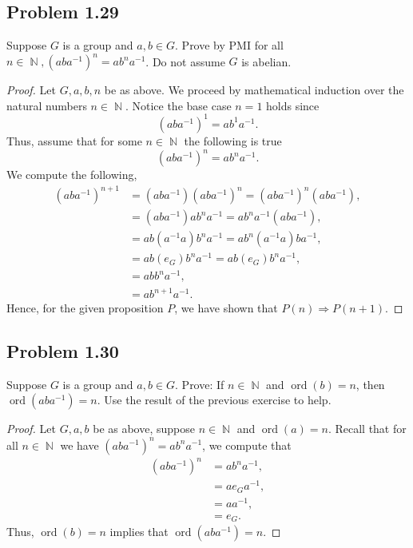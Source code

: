 \documentclass{amsbook}
\DeclareMathOperator{\ord}{\text{ord}}
\DeclareMathOperator{\N}{\mathbb{N}}
\begin{document}
			\subsection*{Problem 1.29}
			\label{sub:problem_1_29}
			Suppose $G$ is a group and $a, b \in G$. 
			Prove by PMI for all $n \in \N, (aba^{-1})^{n} = ab^{n}a^{-1}$.
			Do not assume $G$ is abelian.
			\begin{proof} Let $G,a,b,n$ be as above.
			We proceed by mathematical induction over the natural numbers $n \in \N$.
			Notice the base case $n = 1$ holds since $$\left(aba^{-1}\right)^{1} = ab^{1}a^{-1}.$$
			Thus, assume that for some $n \in \N$ the following is true $$(aba^{-1})^{n} = ab^{n}a^{-1}.$$
			We compute the following,
				\begin{align*}
					\left(aba^{-1}\right)^{n+1} &= \left(aba^{-1}\right)\left(aba^{-1}\right)^{n} = \left(aba^{-1}\right)^{n}\left(aba^{-1}\right),\\
					&= \left(aba^{-1}\right) ab^{n}a^{-1} = ab^{n}a^{-1}\left(aba^{-1}\right), \\
					&= ab\left(a^{-1}a\right)b^{n}a^{-1} = ab^{n}\left(a^{-1}a\right)ba^{-1}, \\
					&= ab(e_{G})b^{n}a^{-1} = ab(e_{G})b^{n}a^{-1}, \\
					&= abb^{n}a^{-1}, \\
					&= ab^{n+1}a^{-1}.
				\end{align*}
			Hence, for the given proposition $P$, we have shown that $P(n) \Rightarrow P(n+1)$.			
			\end{proof}

			\subsection*{Problem 1.30}
			\label{sub:problem_1_30}
			Suppose $G$ is a group and $a, b \in G$. 
			Prove: If $n \in \N$ and $\ord(b) = n$, then $\ord(aba^{-1}) = n$.
			Use the result of the previous exercise to help.
			\begin{proof} Let $G,a,b$ be as above, suppose $n \in \N$ and $\ord(a) = n$.
			Recall that for all $n \in \N$ we have $(aba^{-1})^{n} = ab^{n}a^{-1}$, we compute that
				\begin{align*}
					(aba^{-1})^{n} &= ab^{n}a^{-1}, \\
					&= a e_{G} a^{-1}, \\
					&= aa^{-1}, \\
					&= e_{G}.
				\end{align*}
			Thus, $\ord(b) = n$ implies that $\ord(aba^{-1}) = n$.
			\end{proof}
\end{document}
